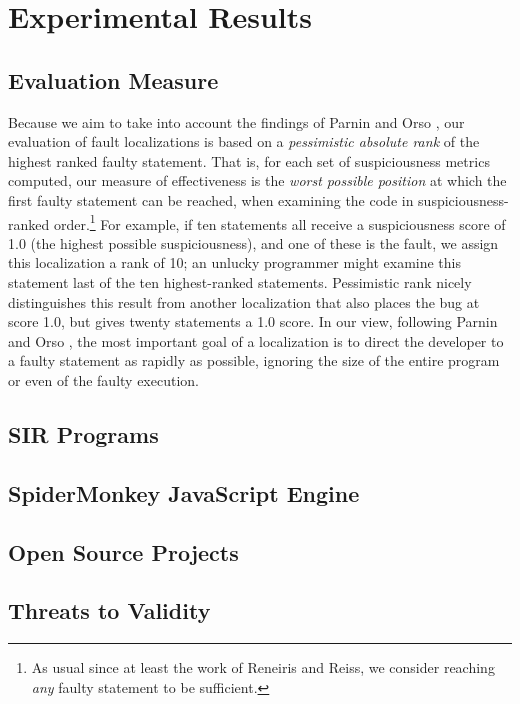 \section{Experimental Results}
\label{sec:experiments}

\subsection{Evaluation Measure}

Because we aim to take into account the findings of Parnin and Orso
\cite{AutoHelp}, our evaluation of fault localizations is based on a
\emph{pessimistic absolute rank} of the highest ranked faulty
statement.  That is, for each set of suspiciousness metrics computed,
our measure of effectiveness is the \emph{worst possible position} at
which the first faulty statement can be reached, when examining the
code in suspiciousness-ranked order.\footnote{As usual since at least
the work of Reneiris and Reiss\cite{NearNeighbor}, we consider
reaching \emph{any} faulty statement to be sufficient.}  For example,
if ten statements all receive a suspiciousness score of 1.0 (the
highest possible suspiciousness), and one of these is the fault, we
assign this localization a rank of 10; an unlucky programmer might
examine this statement last of the ten highest-ranked statements.
Pessimistic rank nicely distinguishes this result from another
localization that also places the bug at score 1.0, but gives twenty
statements a 1.0 score. In our view, following Parnin and Orso
\cite{AutoHelp}, the most important goal of a localization is to
direct the developer to a faulty statement as rapidly as possible,
ignoring the size of the entire program or even of the faulty
execution.  

\subsection{SIR Programs}


\subsection{SpiderMonkey JavaScript Engine}


\subsection{Open Source Projects}
\label{sec:opensource}



\subsection{Threats to Validity}

